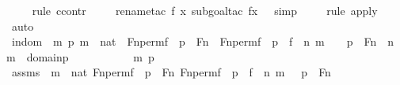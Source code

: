\begin{isabellebody}
\ \ \ \ \isamarkupfalse%
{\isacharparenleft}{\kern0pt}rule\ ccontr{\isacharparenright}{\kern0pt}\isanewline
\ \ \ \ \isamarkupfalse%
{\isacharparenleft}{\kern0pt}rename{\isacharunderscore}{\kern0pt}tac\ f\ x{\isacharcomma}{\kern0pt}\ subgoal{\isacharunderscore}{\kern0pt}tac\ {\isachardoublequoteopen}f{\isacharbackquote}{\kern0pt}x\ {\isacharequal}{\kern0pt}\ {}{\isachardoublequoteclose}{\isacharcomma}{\kern0pt}\ simp{\isacharparenright}{\kern0pt}\isanewline
\ \ \ \ \isamarkupfalse%
{\isacharparenleft}{\kern0pt}rule\ apply{\isacharunderscore}{\kern0pt}{}{\isacharparenright}{\kern0pt}\isanewline
\ \ \ \ \isamarkupfalse%
\ auto\isanewline
\isanewline
\ \ \isamarkupfalse%
\ indom\ {\isacharcolon}{\kern0pt}\ {\isachardoublequoteopen}{\isasymAnd}m\ p{\isachardot}{\kern0pt}\ m\ {\isasymin}\ nat\ {\isasymLongrightarrow}\ Fn{\isacharunderscore}{\kern0pt}perm{\isacharprime}{\kern0pt}{\isacharparenleft}{\kern0pt}f{\isacharparenright}{\kern0pt}\ {\isacharbackquote}{\kern0pt}\ p\ {\isasymin}\ Fn\ {\isasymLongrightarrow}\ Fn{\isacharunderscore}{\kern0pt}perm{\isacharprime}{\kern0pt}{\isacharparenleft}{\kern0pt}f{\isacharparenright}{\kern0pt}\ {\isacharbackquote}{\kern0pt}\ p\ {\isacharbackquote}{\kern0pt}\ {\isasymlangle}f\ {\isacharbackquote}{\kern0pt}\ n{\isacharcomma}{\kern0pt}\ m{\isasymrangle}\ {\isacharequal}{\kern0pt}\ {}\ {\isasymLongrightarrow}\ p\ {\isasymin}\ Fn\ {\isasymLongrightarrow}\ {\isasymlangle}n{\isacharcomma}{\kern0pt}\ m{\isasymrangle}\ {\isasymin}\ domain{\isacharparenleft}{\kern0pt}p{\isacharparenright}{\kern0pt}{\isachardoublequoteclose}\isanewline
\ \ \isamarkupfalse%
\ {\isacharminus}{\kern0pt}\ \isanewline
\ \ \ \ \isamarkupfalse%
\ m\ p\ \isanewline
\ \ \ \ \isamarkupfalse%
\ assms{}\ {\isacharcolon}{\kern0pt}\ {\isachardoublequoteopen}m\ {\isasymin}\ nat{\isachardoublequoteclose}\ {\isachardoublequoteopen}Fn{\isacharunderscore}{\kern0pt}perm{\isacharprime}{\kern0pt}{\isacharparenleft}{\kern0pt}f{\isacharparenright}{\kern0pt}\ {\isacharbackquote}{\kern0pt}\ p\ {\isasymin}\ Fn{\isachardoublequoteclose}\ {\isachardoublequoteopen}Fn{\isacharunderscore}{\kern0pt}perm{\isacharprime}{\kern0pt}{\isacharparenleft}{\kern0pt}f{\isacharparenright}{\kern0pt}\ {\isacharbackquote}{\kern0pt}\ p\ {\isacharbackquote}{\kern0pt}\ {\isasymlangle}f\ {\isacharbackquote}{\kern0pt}\ n{\isacharcomma}{\kern0pt}\ m{\isasymrangle}\ {\isacharequal}{\kern0pt}\ {}{\isachardoublequoteclose}\ {\isachardoublequoteopen}p\ {\isasymin}\ Fn{\isachardoublequoteclose}\ \isanewline

\end{isabellebody}
